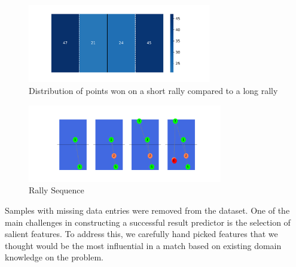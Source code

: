 \begin{figure}[ht]
\centering

\includegraphics[width=8cm]{plots/shortvslongrally.pdf}
\caption{Distribution of points won on a short rally compared to a long rally}

\label{svlr}
\end{figure}

\begin{figure}[ht]
\centering

\includegraphics[width=8.5cm]{plots/tablesequence.pdf}
\caption{Rally Sequence}

\label{sequence}
\end{figure}

 Samples with missing data entries were removed from the dataset. One of the main challenges in constructing a successful result predictor is the selection of salient features. To address this, we carefully hand picked features that we thought would be the most influential in a match based on existing domain knowledge on the problem.